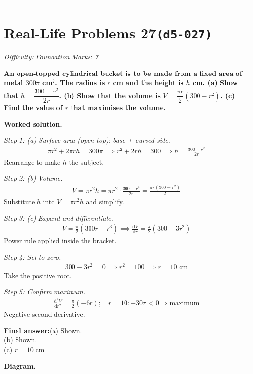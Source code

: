 \documentclass[11pt]{article}
\newcommand{\question}[1]{\par\medskip\noindent\textbf{#1}\par}
\begin{document}
\medskip\hrule

\section*{Real-Life Problems 27\quad\small\texttt{(d5-027)}}
\textit{Difficulty: Foundation \quad\textbar\quad Marks: 7}

\question{An open-topped cylindrical bucket is to be made from a fixed area of metal \( 300\pi \) cm\(^2\). The radius is \( r \) cm and the height is \( h \) cm. (a) Show that \( h = \dfrac{300 - r^2}{2r} \). (b) Show that the volume is \( V = \dfrac{\pi r}{2}(300 - r^2) \). (c) Find the value of \( r \) that maximises the volume.}

\textbf{Worked solution.}

\textit{Step 1: (a) Surface area (open top): base + curved side.}
\[\begin{gathered}
\pi r^2 + 2\pi r h = 300\pi \implies r^2 + 2rh = 300 \implies h = \frac{300 - r^2}{2r}
\end{gathered}\]
Rearrange to make \( h \) the subject.

\textit{Step 2: (b) Volume.}
\[\begin{gathered}
V = \pi r^2 h = \pi r^2 \cdot \frac{300 - r^2}{2r} = \frac{\pi r(300 - r^2)}{2}
\end{gathered}\]
Substitute \( h \) into \( V = \pi r^2 h \) and simplify.

\textit{Step 3: (c) Expand and differentiate.}
\[\begin{gathered}
V = \frac{\pi}{2}(300r - r^3) \implies \frac{\mathrm{d}V}{\mathrm{d}r} = \frac{\pi}{2}(300 - 3r^2)
\end{gathered}\]
Power rule applied inside the bracket.

\textit{Step 4: Set to zero.}
\[\begin{gathered}
300 - 3r^2 = 0 \implies r^2 = 100 \implies r = 10 \text{ cm}
\end{gathered}\]
Take the positive root.

\textit{Step 5: Confirm maximum.}
\[\begin{gathered}
\frac{\mathrm{d}^2V}{\mathrm{d}r^2} = \frac{\pi}{2}(-6r); \quad r=10: -30\pi < 0 \Rightarrow \text{maximum}
\end{gathered}\]
Negative second derivative.

\begin{answerbox}
\textbf{Final answer:}\quad (a) Shown. \\[3pt]  (b) Shown. \\[3pt]  (c) \(\displaystyle  r = 10 \) cm
\end{answerbox}
\textbf{Diagram.}
\end{document}
